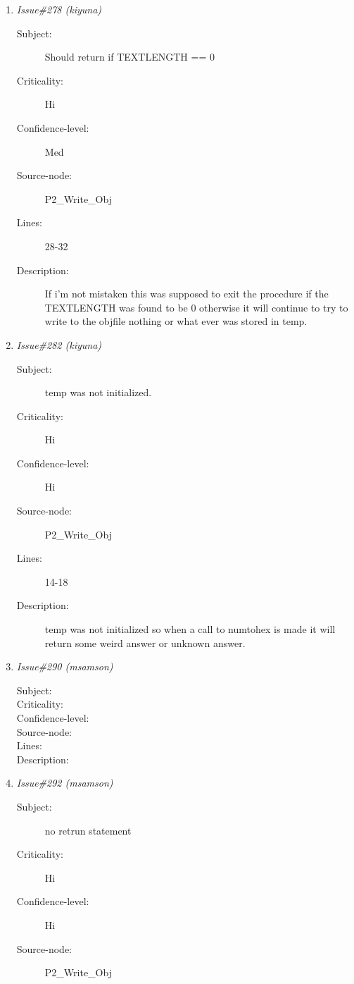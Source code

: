 \begin{enumerate}
\begin{description}
\item [Lines:] 31

\item [Description:] strncmp not checking if == 0.
\end{description}
\item {\it Issue\#278 (kiyuna)}
\begin{description}
\item [Subject:] Should return if TEXTLENGTH == 0
\item [Criticality:] Hi
\item [Confidence-level:] Med
\item [Source-node:] P2\_Write\_Obj

\item [Lines:] 28-32

\item [Description:] If i'm not mistaken this was supposed to exit
the procedure if the TEXTLENGTH was found to be 0 otherwise it will continue
to try to write to the objfile nothing or what ever was stored in temp.
\end{description}
\item {\it Issue\#282 (kiyuna)}
\begin{description}
\item [Subject:] temp was not initialized.
\item [Criticality:] Hi
\item [Confidence-level:] Hi
\item [Source-node:] P2\_Write\_Obj

\item [Lines:] 14-18

\item [Description:] temp was not initialized so when a call to
numtohex is made it will return some weird answer or unknown answer.
\end{description}
\item {\it Issue\#290 (msamson)}
\begin{description}
\item [Subject:] 
\item [Criticality:] 
\item [Confidence-level:] 
\item [Source-node:] 

\item [Lines:] 

\item [Description:] 
\end{description}
\item {\it Issue\#292 (msamson)}
\begin{description}
\item [Subject:] no retrun statement
\item [Criticality:] Hi
\item [Confidence-level:] Hi
\item [Source-node:] P2\_Write\_Obj


\end{description}
\end{enumerate}
